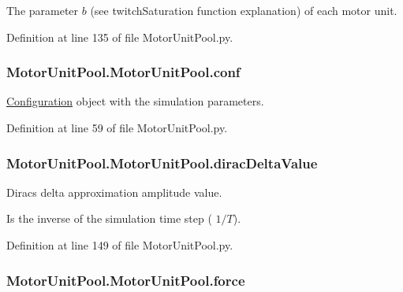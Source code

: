 The parameter $b$ (see twitch\+Saturation function explanation) of each motor unit. 



Definition at line 135 of file Motor\+Unit\+Pool.\+py.

\subsubsection[{\texorpdfstring{conf}{conf}}]{\setlength{\rightskip}{0pt plus 5cm}Motor\+Unit\+Pool.\+Motor\+Unit\+Pool.\+conf}\hypertarget{class_motor_unit_pool_1_1_motor_unit_pool_a3b2ee8f3e5500bfdc8fa731a5cb7d622}{}\label{class_motor_unit_pool_1_1_motor_unit_pool_a3b2ee8f3e5500bfdc8fa731a5cb7d622}


\hyperlink{namespace_configuration}{Configuration} object with the simulation parameters. 



Definition at line 59 of file Motor\+Unit\+Pool.\+py.

\subsubsection[{\texorpdfstring{dirac\+Delta\+Value}{diracDeltaValue}}]{\setlength{\rightskip}{0pt plus 5cm}Motor\+Unit\+Pool.\+Motor\+Unit\+Pool.\+dirac\+Delta\+Value}\hypertarget{class_motor_unit_pool_1_1_motor_unit_pool_a48b53d4f838ca8cfe2bc41c8308f2060}{}\label{class_motor_unit_pool_1_1_motor_unit_pool_a48b53d4f838ca8cfe2bc41c8308f2060}


Dirac\textquotesingle{}s delta approximation amplitude value. 

Is the inverse of the simulation time step ( $1/T$). 

Definition at line 149 of file Motor\+Unit\+Pool.\+py.

\subsubsection[{\texorpdfstring{force}{force}}]{\setlength{\rightskip}{0pt plus 5cm}Motor\+Unit\+Pool.\+Motor\+Unit\+Pool.\+force}\hypertarget{class_motor_unit_pool_1_1_motor_unit_pool_a97011c17140c45a42a00105279f014ad}{}\label{class_motor_unit_pool_1_1_motor_unit_pool_a97011c17140c45a42a00105279f014ad}


